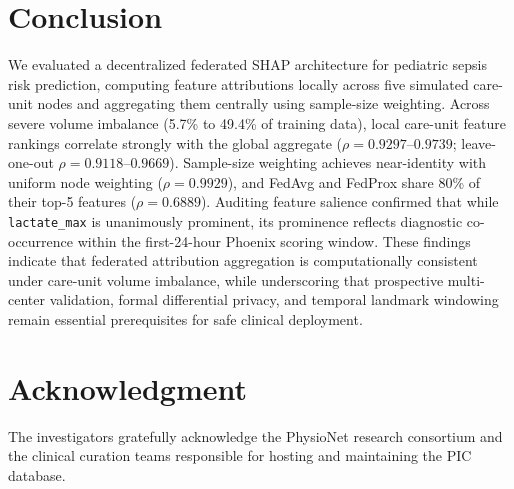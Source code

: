 \documentclass[runningheads]{llncs}
\begin{document}
\section{Conclusion}\label{sec:concl}

We evaluated a decentralized federated SHAP architecture for pediatric sepsis risk prediction, computing feature attributions locally across five simulated care-unit nodes and aggregating them centrally using sample-size weighting. Across severe volume imbalance (5.7\% to 49.4\% of training data), local care-unit feature rankings correlate strongly with the global aggregate ($\rho = 0.9297$--$0.9739$; leave-one-out $\rho = 0.9118$--$0.9669$). Sample-size weighting achieves near-identity with uniform node weighting ($\rho = 0.9929$), and FedAvg and FedProx share 80\% of their top-5 features ($\rho = 0.6889$). Auditing feature salience confirmed that while \texttt{lactate\_max} is unanimously prominent, its prominence reflects diagnostic co-occurrence within the first-24-hour Phoenix scoring window. These findings indicate that federated attribution aggregation is computationally consistent under care-unit volume imbalance, while underscoring that prospective multi-center validation, formal differential privacy, and temporal landmark windowing remain essential prerequisites for safe clinical deployment.

\section*{Acknowledgment}
The investigators gratefully acknowledge the PhysioNet research consortium and the clinical curation teams responsible for hosting and maintaining the PIC database.



\end{document}
